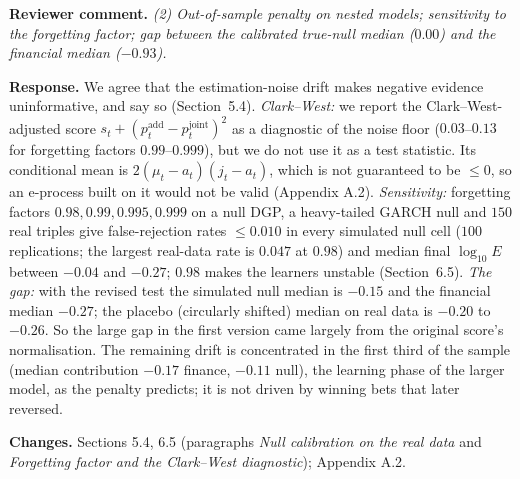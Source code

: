 \documentclass[11pt,a4paper]{article}
\newcommand{\rev}[1]{\par\noindent\textbf{Reviewer comment.} \emph{#1}}
\newcommand{\resp}{\par\noindent\textbf{Response.} }
\newcommand{\chg}{\par\noindent\textbf{Changes.} }
\begin{document}
\rev{(2) Out-of-sample penalty on nested models; sensitivity to the forgetting factor; gap between the calibrated true-null median ($0.00$) and the financial median ($-0.93$).}
\resp We agree that the estimation-noise drift makes negative evidence uninformative, and say so (Section~5.4). \emph{Clark--West:} we report the Clark--West-adjusted score $s_t+(p^{\mathrm{add}}_t-p^{\mathrm{joint}}_t)^2$ as a diagnostic of the noise floor ($0.03$--$0.13$ for forgetting factors $0.99$--$0.999$), but we do not use it as a test statistic. Its conditional mean is $2(\mu_t-a_t)(j_t-a_t)$, which is not guaranteed to be $\le0$, so an e-process built on it would not be valid (Appendix A.2). \emph{Sensitivity:} forgetting factors $0.98,0.99,0.995,0.999$ on a null DGP, a heavy-tailed GARCH null and $150$ real triples give false-rejection rates $\le0.010$ in every simulated null cell ($100$ replications; the largest real-data rate is $0.047$ at $0.98$) and median final $\log_{10}E$ between $-0.04$ and $-0.27$; $0.98$ makes the learners unstable (Section~6.5). \emph{The gap:} with the revised test the simulated null median is $-0.15$ and the financial median $-0.27$; the placebo (circularly shifted) median on real data is $-0.20$ to $-0.26$. So the large gap in the first version came largely from the original score's normalisation. The remaining drift is concentrated in the first third of the sample (median contribution $-0.17$ finance, $-0.11$ null), the learning phase of the larger model, as the penalty predicts; it is not driven by winning bets that later reversed.
\chg Sections 5.4, 6.5 (paragraphs \emph{Null calibration on the real data} and \emph{Forgetting factor and the Clark--West diagnostic}); Appendix A.2.
\end{document}
